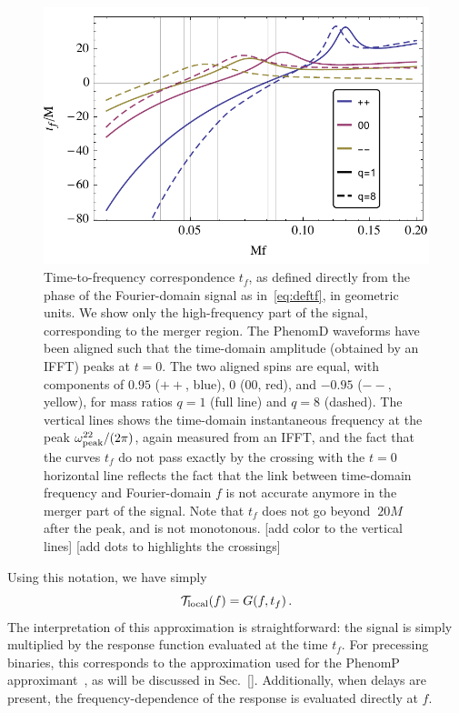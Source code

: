 \documentclass[aps,showpacs,twocolumn,
prd,superscriptaddress,nofootinbib]{revtex4-1}
\newcommand{\be}{\begin{equation}}
\newcommand{\ee}{\end{equation}}
\newcommand\calT{{\mathcal{T}}}
\newcommand{\tf}{t_{f}}
\newcommand{\SM}[1]{{\color{Red} #1}}
\begin{document}
\begin{figure}
  \centering
  \includegraphics[width=.98\linewidth]{plots/tf.pdf}
  \caption{Time-to-frequency correspondence $t_{f}$, as defined directly from the phase of the Fourier-domain signal as in~\eqref{eq:deftf}, in geometric units. We show only the high-frequency part of the signal, corresponding to the merger region. The PhenomD waveforms have been aligned such that the time-domain amplitude (obtained by an IFFT) peaks at $t=0$. The two aligned spins are equal, with components of $0.95$ ($++$, blue), $0$ ($00$, red), and $-0.95$ ($--$, yellow), for mass ratios $q=1$ (full line) and $q=8$ (dashed). The vertical lines shows the time-domain instantaneous frequency at the peak $\omega^{22}_{\rm peak}/(2\pi)$, again measured from an IFFT, and the fact that the curves $t_{f}$ do not pass exactly by the crossing with the $t=0$ horizontal line reflects the fact that the link between time-domain frequency and Fourier-domain $f$ is not accurate anymore in the merger part of the signal. Note that $t_{f}$ does not go beyond $~20M$ after the peak, and is not monotonous. \SM{[add color to the vertical lines]} \SM{[add dots to highlights the crossings]}}
  \label{fig:tf}
\end{figure}

Using this notation, we have simply
\be\label{eq:transferlocal}
	\calT_{\rm local}(f) = G(f, \tf) \,.
\ee
The interpretation of this approximation is straightforward: the signal is simply multiplied by the response function evaluated at the time $\tf$. For precessing binaries, this corresponds to the approximation used for the PhenomP approximant~\cite{Hannam+13}, as will be discussed in Sec.~\ref{}. Additionally, when delays are present, the frequency-dependence of the response is evaluated directly at $f$.
\end{document}
